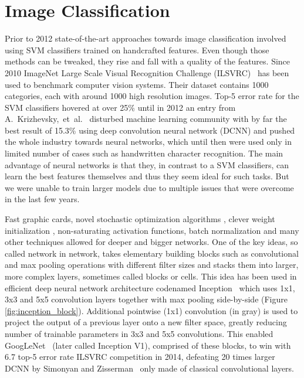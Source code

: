 \section{Image Classification}
Prior to 2012 state-of-the-art approaches towards image classification involved using SVM classifiers trained on handcrafted features. Even though those methods can be tweaked, they rise and fall with a quality of the features. Since 2010 ImageNet Large Scale Visual Recognition Challenge (ILSVRC)~\cite{ILSVRC15} has been used to benchmark computer vision systems. Their dataset contains 1000 categories, each with around 1000 high resolution images. Top-5 error rate for the SVM classifiers hovered at over 25\% until in 2012 an entry from A.~Krizhevsky,~et~al.~\cite{AlexNet} disturbed machine learning community with by far the best result of 15.3\% using deep convolution neural network (DCNN) and pushed the whole industry towards neural networks, which until then were used only in limited number of cases such as handwritten character recognition. The main advantage of neural networks is that they, in contrast to a SVM classifiers, can learn the best features themselves and thus they seem ideal for such tasks. But we were unable to train larger models due to multiple issues that were overcome in the last few years.

Fast graphic cards, novel stochastic optimization algorithms \cite{kingma2014adam}, clever weight initialization \cite{glorot2010understanding}, non-saturating activation functions, batch normalization \cite{ioffe2015batch} and many other techniques allowed for deeper and bigger networks. One of the key ideas, so called network in network, takes elementary building blocks such as convolutional and max pooling operations with different filter sizes and stacks them into larger, more complex layers, sometimes called blocks or cells. This idea has been used in efficient deep neural network architecture codenamed Inception~\cite{szegedy2015going} which uses 1x1, 3x3 and 5x5 convolution layers together with max pooling side-by-side (Figure \ref{fig:inception_block}). Additional pointwise (1x1) convolution (in gray) is used to project the output of a previous layer onto a new filter space, greatly reducing number of trainable parameters in 3x3 and 5x5 convolutions. This enabled GoogLeNet~\cite{szegedy2015going} (later called Inception V1), comprised of these blocks, to win with 6.7 top-5 error rate ILSVRC competition in 2014, defeating 20 times larger DCNN by Simonyan and Zisserman~\cite{simonyan2014very} only made of classical convolutional layers.

